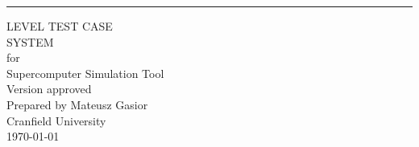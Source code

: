 \begin{flushright}
    \rule{16cm}{5pt}\vskip1cm
    \begin{bfseries}
        \Huge{LEVEL TEST CASE\\SYSTEM}\\
        \vspace{1.9cm}
        for\\
        \vspace{1.9cm}
	    Supercomputer Simulation Tool\\
        \vspace{1.9cm}
        \LARGE{Version \myversion approved}\\
        \vspace{1.9cm}
        Prepared by Mateusz Gasior\\
        \vspace{1.9cm}
        Cranfield University\\
        \vspace{1.9cm}
        \today\\
    \end{bfseries}
\end{flushright}